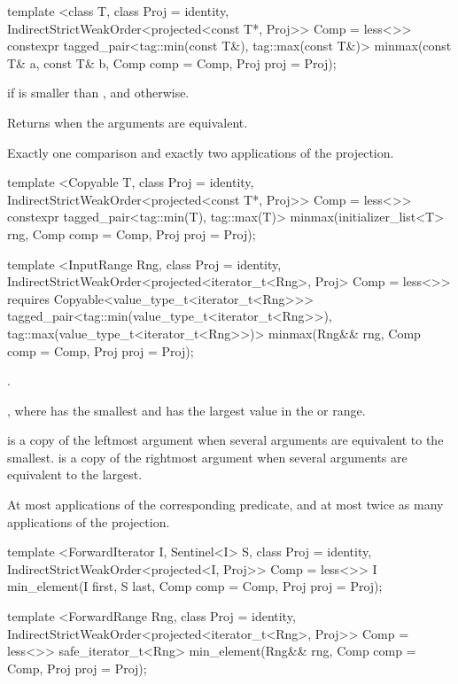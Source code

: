 %
\begin{itemdecl}
template <class T, class Proj = identity,
    IndirectStrictWeakOrder<projected<const T*, Proj>> Comp = less<>>
  constexpr tagged_pair<tag::min(const T&), tag::max(const T&)>
    minmax(const T& a, const T& b, Comp comp = Comp{}, Proj proj = Proj{});
\end{itemdecl}

\begin{itemdescr}
\pnum
\returns
{} if  is smaller
than , and
 otherwise.

\pnum
\notes
Returns  when the arguments are equivalent.

\pnum
\complexity
Exactly one comparison and exactly two applications of the projection.
\end{itemdescr}

%
\begin{itemdecl}
template <Copyable T, class Proj = identity,
    IndirectStrictWeakOrder<projected<const T*, Proj>> Comp = less<>>
  constexpr tagged_pair<tag::min(T), tag::max(T)>
    minmax(initializer_list<T> rng, Comp comp = Comp{}, Proj proj = Proj{});

template <InputRange Rng, class Proj = identity,
    IndirectStrictWeakOrder<projected<iterator_t<Rng>, Proj> Comp = less<>>
  requires Copyable<value_type_t<iterator_t<Rng>>>
  tagged_pair<tag::min(value_type_t<iterator_t<Rng>>),
              tag::max(value_type_t<iterator_t<Rng>>)>
    minmax(Rng&& rng, Comp comp = Comp{}, Proj proj = Proj{});
\end{itemdecl}

\begin{itemdescr}
\pnum
\requires {}.

\pnum
\returns {}, where  has the smallest and  has the
largest value in the  or range.

\pnum
\remarks {} is a copy of the leftmost argument when several arguments are equivalent to
the smallest.  is a copy of the rightmost argument when several arguments are
equivalent to the largest.

\pnum
\complexity At most 
applications of the corresponding predicate, and at most twice as many applications of the projection.
\end{itemdescr}

%
\begin{itemdecl}
template <ForwardIterator I, Sentinel<I> S, class Proj = identity,
    IndirectStrictWeakOrder<projected<I, Proj>> Comp = less<>>
  I min_element(I first, S last, Comp comp = Comp{}, Proj proj = Proj{});

template <ForwardRange Rng, class Proj = identity,
    IndirectStrictWeakOrder<projected<iterator_t<Rng>, Proj>> Comp = less<>>
  safe_iterator_t<Rng>
    min_element(Rng&& rng, Comp comp = Comp{}, Proj proj = Proj{});
\end{itemdecl}

